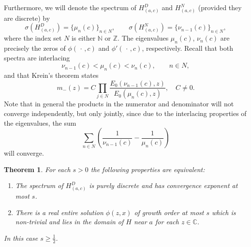 \documentclass{amsart}
\newtheorem{theorem}{Theorem}[section]
\numberwithin{equation}{section}
\begin{document}
Furthermore, we will denote the spectrum of $H_{(a,c)}^D$ and $H_{(a,c)}^N$ (provided they are discrete) by
\begin{equation}
{\sigma}(H_{(a,c)}^D) = \{ \mu_n(c) \}_{n\in N}, \qquad {\sigma}(H_{(a,c)}^N) = \{ \nu_{n-1}(c) \}_{n\in N},
\end{equation}
where the index set $N$ is either ${{\mathbb N}}$ or ${{\mathbb Z}}$. The eigenvalues $\mu_n(c)$, $\nu_n(c)$ are precisely the zeros
of $\phi(\,\cdot\,,c)$ and $\phi'(\,\cdot\,,c)$, respectively. Recall that both spectra are interlacing
\begin{equation}\label{IOinterlacing}
\nu_{n-1}(c) < \mu_n(c) < \nu_n(c), \qquad n\in N,
\end{equation}
and that Krein's theorem \cite[Theorem~27.2.1]{lev} states
\begin{equation}\label{eqKrein}
m_-(z) = C \prod_{j\in N} \frac{E_0(\nu_{n-1}(c),z)}{E_0(\mu_n(c),z)}, \quad C\ne 0.
\end{equation}
Note that in general the products in the numerator and denominator will not converge independently, but
only jointly, since due to the interlacing properties of the eigenvalues, the sum
\[
\sum_{n\in N} \left( \frac{1}{\nu_{n-1}(c)} -  \frac{1}{\mu_n(c)}\right)
\]
will converge.

\begin{theorem}\label{thm:IOphiev}
For each $s>0$ the following properties are equivalent:
\begin{enumerate}
\item The spectrum of $H_{(a,c)}^D$ is purely discrete and has convergence exponent at most $s$.
\item There  is a real entire solution $\phi(z,x)$ of growth order at most $s$ which is non-trivial and lies in the domain of $H$ near $a$ for each $z\in{{\mathbb C}}$.
\end{enumerate} 
In this case $s\geq\frac{1}{2}$.
\end{theorem}
\end{document}
